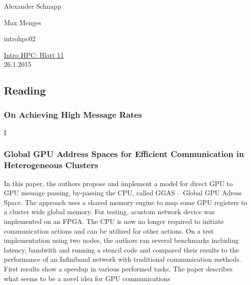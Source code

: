 \documentclass[a4paper,11pt]{scrartcl}
\begin{document}
\hfill Alexander Schnapp

\hfill Max Menges

\hfill introhpc02

\begin{center}
\underline{\Huge{Intro HPC: Blatt 11}}\\
\large{26.1.2015}\\
\end{center}


\subsection{Reading}
\subsubsection{On Achieving High Message Rates}
I
\subsubsection{Global GPU Address Spaces for Efficient
Communication in Heterogeneous Clusters}
In this paper, the authors propose and implement a model for direct GPU to GPU message passing, by-passing the CPU, called GGAS -- Global GPU Adress Space. The approach uses a shared memory engine to map some GPU registers to a cluster wide global memory. For testing, acustom network device was implemented on an FPGA. 
The CPU is now no longer required to initiate communication actions and can be utilized for other actions. On a test implementation using two nodes, the authors ran several benchmarks including latency, bandwith and running a stencil code and compared their results to the performance of an Infiniband network with traditional communication methods. First results show a speedup in various performed tasks.
The paper describes what seems to be a novel idea for GPU communications 
\end{document}
